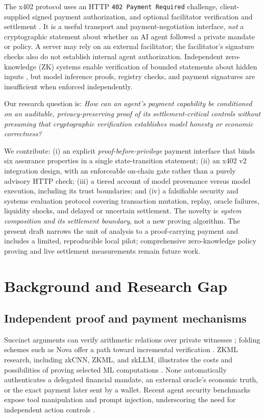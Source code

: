 \documentclass[conference]{IEEEtran}
\begin{document}
The x402 protocol uses an HTTP \texttt{402 Payment Required} challenge, client-supplied signed payment authorization, and optional facilitator verification and settlement \cite{x402spec,solanax402}. It is a useful transport and payment-negotiation interface, \emph{not} a cryptographic statement about whether an AI agent followed a private mandate or policy. A server may rely on an external facilitator; the facilitator's signature checks also do not establish internal agent authorization. Independent zero-knowledge (ZK) systems enable verification of bounded statements about hidden inputs \cite{goldwasser1989,groth2016,plonk2019}, but model inference proofs, registry checks, and payment signatures are insufficient when enforced independently.

Our research question is: \emph{How can an agent's payment capability be conditioned on an auditable, privacy-preserving proof of its settlement-critical controls without presuming that cryptographic verification establishes model honesty or economic correctness?}

We contribute: (i) an explicit \emph{proof-before-privilege} payment interface that binds six assurance properties in a single state-transition statement; (ii) an x402 v2 integration design, with an enforceable on-chain gate rather than a purely advisory HTTP check; (iii) a tiered account of model provenance versus model execution, including its trust boundaries; and (iv) a falsifiable security and systems evaluation protocol covering transaction mutation, replay, oracle failures, liquidity shocks, and delayed or uncertain settlement. The novelty is \emph{system composition and its settlement boundary}, not a new proving algorithm. The present draft narrows the unit of analysis to a proof-carrying payment and includes a limited, reproducible local pilot; comprehensive zero-knowledge policy proving and live settlement measurements remain future work.

\section{Background and Research Gap}
\subsection{Independent proof and payment mechanisms}
Succinct arguments can verify arithmetic relations over private witnesses \cite{groth2016,plonk2019}; folding schemes such as Nova offer a path toward incremental verification \cite{nova2022}. ZKML research, including zkCNN, ZKML, and zkLLM, illustrates the costs and possibilities of proving selected ML computations \cite{zkcnn2021,zkml2024,zkllm2024}. None automatically authenticates a delegated financial mandate, an external oracle's economic truth, or the exact payment later sent by a wallet. Recent agent security benchmarks expose tool manipulation and prompt injection, underscoring the need for independent action controls \cite{toolemu2024,agentdojo2024}.
\end{document}
